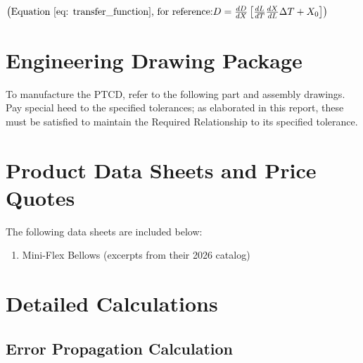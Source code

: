 \documentclass[12pt, letterpaper]{report}%
\newcommand{\device}{PTCD}
\begin{document}
\begin{appendices}
\begin{table}[H]
\begin{tabular}{|m{}|m{}|m{}|}
        \\ \hline

    \end{tabular}
\end{table}

$\left( \text{Equation\ \ref{eq: transfer_function}, for reference:} D = \frac{dD}{dX} \left[ \frac{dL}{dT} \frac{dX}{dL} \Delta T + X_0 \right] \right)$

\chapter{Engineering Drawing Package}
\label{app:drawings}

To manufacture the \device , refer to the following part and assembly drawings.
Pay special heed to the specified tolerances; as elaborated in this report, these must be satisfied to maintain the Required Relationship to its specified tolerance.



\chapter{Product Data Sheets and Price Quotes}
\label{app:datasheets}

The following data sheets are included below:

\begin{enumerate}
    \item Mini-Flex Bellows (excerpts from their 2026 catalog)
\end{enumerate}





\chapter{Detailed Calculations}
\label{app:calculations}

\section{Error Propagation Calculation}
\label{app:errorProp}


\end{appendices}
\end{document}
